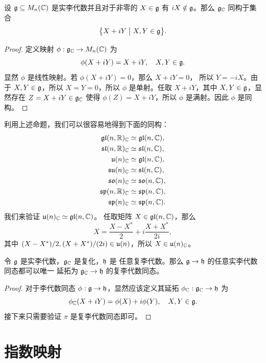 \begin{proposition}
  设 $\mathfrak{g}\subseteq M_n(\mathbb{C})$ 是实李代数并且对于非零的 $X\in\mathfrak{g}$
  有 $iX\notin\mathfrak{g}$。那么 $\mathfrak{g}_{\mathbb{C}}$ 同构于集合
  \[
    \bigl\{X+iY\bigm| X,Y\in\mathfrak{g}\bigr\}.
  \]
\end{proposition}
\begin{proof}
  定义映射 $\phi:\mathfrak{g}_{\mathbb{C}}\to M_n(\mathbb{C})$ 为
  \[
    \phi(X+iY)=X+iY,\quad X,Y\in\mathfrak{g}.
  \]
  显然 $\phi$ 是线性映射。若 $\phi(X+iY)=0$，那么 $X+iY=0$，
  所以 $Y=-iX$。由于 $X,Y\in\mathfrak{g}$，所以 $X=Y=0$，所以 $\phi$
  是单射。任取 $X+iY$，其中 $X,Y\in\mathfrak{g}$，显然存在
  $Z=X+iY\in\mathfrak{g}_{\mathbb{C}}$ 使得 $\phi(Z)=X+iY$，所以 $\phi$
  是满射。因此 $\phi$ 是同构。
\end{proof}

利用上述命题，我们可以很容易地得到下面的同构：
\begin{align*}
  \mathfrak{gl}(n,\mathbb{R})_{\mathbb{C}}&\simeq \mathfrak{gl}(n,\mathbb{C}),\\
  \mathfrak{sl}(n,\mathbb{R})_{\mathbb{C}}&\simeq \mathfrak{sl}(n,\mathbb{C}),\\
  \mathfrak{u}(n)_{\mathbb{C}}&\simeq \mathfrak{gl}(n,\mathbb{C}),\\
  \mathfrak{su}(n)_{\mathbb{C}}&\simeq \mathfrak{sl}(n,\mathbb{C}),\\
  \mathfrak{so}(n)_{\mathbb{C}}&\simeq \mathfrak{so}(n,\mathbb{C}),\\
  \mathfrak{sp}(n,\mathbb{R})_{\mathbb{C}}&\simeq \mathfrak{sp}(n,\mathbb{C}),\\
  \mathfrak{sp}(n)_{\mathbb{C}}&\simeq \mathfrak{sp}(n,\mathbb{C}).
\end{align*}
我们来验证 $\mathfrak{u}(n)_{\mathbb{C}}\simeq \mathfrak{gl}(n,\mathbb{C})$。
任取矩阵 $X\in \mathfrak{gl}(n,\mathbb{C})$，那么 
\[
  X=\frac{X-X^*}{2}+i\frac{X+X^*}{2i},
\]
其中 $(X-X^*)/2,(X+X^*)/(2i)\in \mathfrak{u}(n)$，所以 $X\in \mathfrak{u}(n)_{\mathbb{C}}$。

\begin{proposition}
  令 $\mathfrak{g}$ 是实李代数，$\mathfrak{g}_{\mathbb{C}}$ 是复化，$\mathfrak{h}$ 是
  任意复李代数。那么 $\mathfrak{g}\to\mathfrak{h}$ 的任意实李代数同态都可以唯一
  延拓为 $\mathfrak{g}_{\mathbb{C}}\to\mathfrak{h}$ 的复李代数同态。
\end{proposition}
\begin{proof}
  对于李代数同态 $\phi:\mathfrak{g}\to\mathfrak{h}$，显然应该定义其延拓
  $\phi_{\mathbb{C}}:\mathfrak{g}_{\mathbb{C}}\to\mathfrak{h}$ 为
  \[
    \phi_{\mathbb{C}}(X+iY)=\phi(X)+i\phi(Y),\quad X,Y\in\mathfrak{g}.
  \]
  接下来只需要验证 $\pi$ 是复李代数同态即可。
\end{proof}

\section{指数映射}









